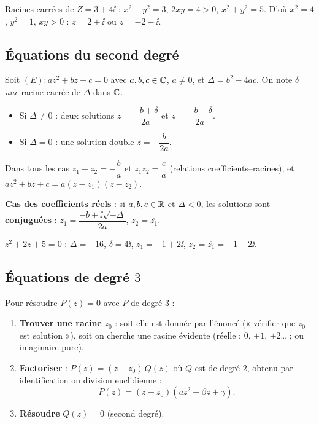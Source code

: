 \begin{exemple}
	Racines carrées de $Z = 3 + 4\ii$ : $x^2 - y^2 = 3$, $2xy = 4 > 0$,
	$x^2 + y^2 = 5$. D'où $x^2 = 4$, $y^2 = 1$, $xy > 0$ :
	$z = 2 + \ii$ ou $z = -2 - \ii$.
\end{exemple}

\subsection{Équations du second degré}

\begin{theoreme}
	Soit $(E) : az^2 + bz + c = 0$ avec $a, b, c \in \mathbb{C}$, $a \neq 0$, et
	$\Delta = b^2 - 4ac$. On note $\delta$ \emph{une} racine carrée de $\Delta$
	dans $\mathbb{C}$.
	\begin{itemize}[label=\textbullet]
		\item Si $\Delta \neq 0$ : deux solutions
		$z = \dfrac{-b + \delta}{2a}$ et $z = \dfrac{-b - \delta}{2a}$.
		\item Si $\Delta = 0$ : une solution double $z = -\dfrac{b}{2a}$.
	\end{itemize}
	Dans tous les cas $z_1 + z_2 = -\dfrac{b}{a}$ et $z_1 z_2 = \dfrac{c}{a}$
	(relations coefficients–racines), et $az^2 + bz + c = a(z - z_1)(z - z_2)$.

	\textbf{Cas des coefficients réels} : si $a,b,c \in \mathbb{R}$ et $\Delta < 0$,
	les solutions sont \textbf{conjuguées} :
	$z_1 = \dfrac{-b + \ii\sqrt{-\Delta}}{2a}$, $z_2 = \overline{z_1}$.
\end{theoreme}

\begin{exemple}
	$z^2 + 2z + 5 = 0$ : $\Delta = -16$, $\delta = 4\ii$,
	$z_1 = -1 + 2\ii$, $z_2 = \overline{z_1} = -1 - 2\ii$.
\end{exemple}

\subsection{Équations de degré $3$}

\begin{methode}
	Pour résoudre $P(z) = 0$ avec $P$ de degré $3$ :
	\begin{enumerate}
		\item \textbf{Trouver une racine} $z_0$ : soit elle est donnée par
		l'énoncé (« vérifier que $z_0$ est solution »), soit on cherche une
		racine évidente (réelle : $0$, $\pm1$, $\pm2$… ; ou imaginaire pure).
		\item \textbf{Factoriser} : $P(z) = (z - z_0)\,Q(z)$ où $Q$ est de
		degré $2$, obtenu par identification ou division euclidienne :
		$$
		P(z) = (z - z_0)(a z^2 + \beta z + \gamma).
		$$
		\item \textbf{Résoudre} $Q(z) = 0$ (second degré).
	\end{enumerate}
\end{methode}

